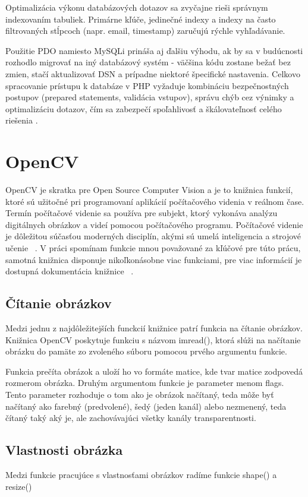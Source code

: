 Optimalizácia výkonu databázových dotazov sa zvyčajne rieši správnym indexovaním tabuliek. Primárne kľúče, jedinečné 
indexy a indexy na často filtrovaných stĺpcoch (napr. email, timestamp) zaručujú rýchle vyhľadávanie.

Použitie PDO namiesto MySQLi prináša aj ďalšiu výhodu, ak by sa v budúcnosti rozhodlo migrovať na iný databázový systém - väčšina 
kódu zostane bežať bez zmien, stačí aktualizovať DSN a prípadne niektoré špecifické nastavenia. Celkovo spracovanie prístupu k 
databáze v PHP vyžaduje kombináciu bezpečnostných postupov (prepared statements, validácia vstupov), správu chýb cez výnimky a 
optimalizáciu dotazov, čím sa zabezpečí spoľahlivosť a škálovateľnosť celého riešenia \cite{php_manual_pdo}.


\section{OpenCV}
\label{sec:opencv}
OpenCV je skratka pre Open Source Computer Vision a je to knižnica funkcií, ktoré sú užitočné pri programovaní 
aplikácií počítačového videnia v reálnom čase. Termín počítačové videnie sa používa pre subjekt, ktorý vykonáva 
analýzu digitálnych obrázkov a videí pomocou počítačového programu. Počítačové videnie je dôležitou súčasťou 
moderných disciplín, akými sú umelá inteligencia a strojové učenie ~\cite{tutorialspoint_opencv}. V práci 
spomínam funkcie mnou považované za kľúčové pre túto prácu, samotná knižnica disponuje nikoľkonásobne viac 
funkciami, pre viac informácií je dostupná dokumentácia knižnice ~\cite{documentation_opencv}.

\subsection{Čítanie obrázkov}
Medzi jednu z najdôležitejších funckcií knižnice patrí funkcia na čítanie obrázkov. Knižnica OpenCV poskytuje 
funkciu s názvom imread(), ktorá slúži na načítanie obrázku do pamäte zo zvoleného súboru pomocou prvého argumentu 
funkcie.  

Funkcia prečíta obrázok a uloží ho vo formáte matice, kde tvar matice zodpovedá rozmerom obrázka. Druhým argumentom 
funkcie je parameter menom flags. Tento parameter rozhoduje o tom ako je obrázok načítaný, teda môže byť načítaný 
ako farebný (predvolené), šedý (jeden kanál) alebo nezmenený, teda čítaný taký aký je, ale zachovávajúci všetky 
kanály transparentnosti.

\subsection{Vlastnosti obrázka}
Medzi funkcie pracujúce s vlastnosťami obrázkov radíme funkcie shape() a resize()

